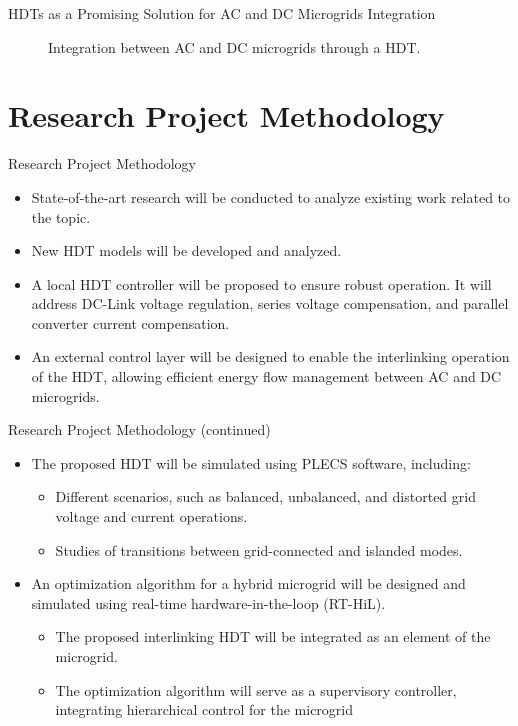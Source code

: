 \begin{frame}{HDTs as a Promising Solution for AC and DC Microgrids Integration}
    \begin{figure}
        \centering
        \resizebox{!}{5.3cm}{}
        \caption{Integration between AC and DC microgrids through a HDT.}
    \end{figure}
\end{frame}

\section{Research Project Methodology}

\begin{frame}{Research Project Methodology}
    \begin{itemize}
        \item State-of-the-art research will be conducted to analyze existing work related to the topic.
        \item New HDT models will be developed and analyzed.
        \item A local HDT controller will be proposed to ensure robust operation. It will address DC-Link voltage regulation, series voltage compensation, and parallel converter current compensation.
        \item An external control layer will be designed to enable the interlinking operation of the HDT, allowing efficient energy flow management between AC and DC microgrids.
    \end{itemize}
\end{frame}

\begin{frame}{Research Project Methodology (continued)}
    \begin{itemize}
        \item The proposed HDT will be simulated using PLECS software, including:
        \begin{itemize}
            \item Different scenarios, such as balanced, unbalanced, and distorted grid voltage and current operations.
            \item Studies of transitions between grid-connected and islanded modes.
        \end{itemize}
        \item An optimization algorithm for a hybrid microgrid will be designed and simulated using real-time hardware-in-the-loop (RT-HiL).
        \begin{itemize}
            \item The proposed interlinking HDT will be integrated as an element of the microgrid.
            \item The optimization algorithm will serve as a supervisory controller, integrating hierarchical control for the microgrid
        \end{itemize}
    \end{itemize}
\end{frame}

